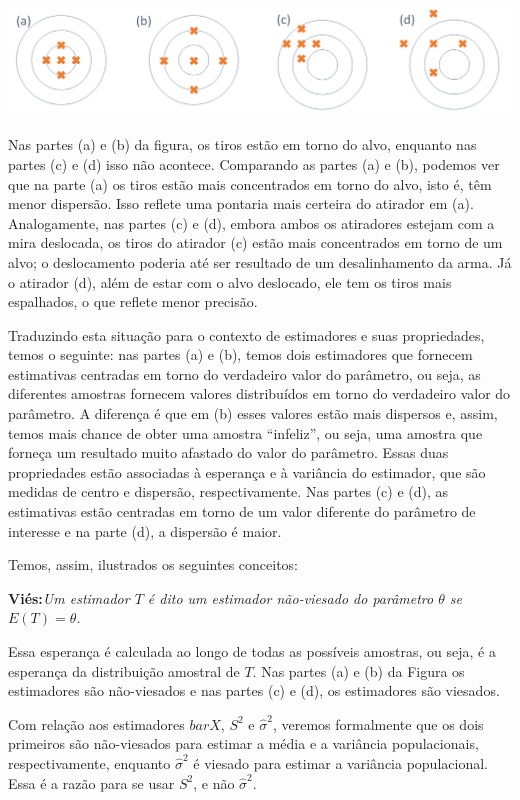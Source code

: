 \documentclass[
]{book}
\begin{document}
\includegraphics{Estimadores_exemplo.png}

Nas partes (a) e (b) da figura, os tiros estão em torno do alvo, enquanto nas partes (c) e (d) isso não acontece. Comparando as partes (a) e (b), podemos ver que na parte (a) os tiros estão mais concentrados em torno do alvo, isto é, têm menor dispersão. Isso reflete uma pontaria mais certeira do atirador em (a). Analogamente, nas partes (c) e (d), embora ambos os atiradores estejam com a mira deslocada, os tiros do atirador (c) estão mais concentrados em torno de um alvo; o deslocamento poderia até ser resultado de um desalinhamento da arma. Já o atirador (d), além de estar com o alvo deslocado, ele tem os tiros mais espalhados, o que reflete menor precisão.

Traduzindo esta situação para o contexto de estimadores e suas propriedades, temos o seguinte: nas partes (a) e (b), temos dois estimadores que fornecem estimativas centradas em torno do verdadeiro valor do parâmetro, ou seja, as diferentes amostras fornecem valores distribuídos em torno do verdadeiro valor do parâmetro. A diferença é que em (b) esses valores estão mais dispersos e, assim, temos mais chance de obter uma amostra ``infeliz'', ou seja, uma amostra que forneça um resultado muito afastado do valor do parâmetro. Essas duas propriedades estão associadas à esperança e à variância do estimador, que são medidas de centro e dispersão, respectivamente. Nas partes (c) e (d), as estimativas estão centradas em torno de um valor diferente do parâmetro de interesse e na parte (d), a dispersão é maior.

Temos, assim, ilustrados os seguintes conceitos:

\textbf{Viés:}\emph{Um estimador $T$ é dito um estimador não-viesado do parâmetro $\theta$ se $E(T)=\theta$.}

Essa esperança é calculada ao longo de todas as possíveis amostras, ou seja, é a esperança da distribuição amostral de \(T\). Nas partes (a) e (b) da Figura os estimadores são não-viesados e nas partes (c) e (d), os estimadores são viesados.

Com relação aos estimadores \(bar X\), \(S^2\) e \(\hat \sigma^2\), veremos formalmente que os dois primeiros são não-viesados para estimar a média e a variância populacionais, respectivamente, enquanto \(\hat \sigma^2\) é viesado para estimar a variância populacional. Essa é a razão para se usar \(S^2\), e não \(\hat \sigma^2\).
\end{document}
